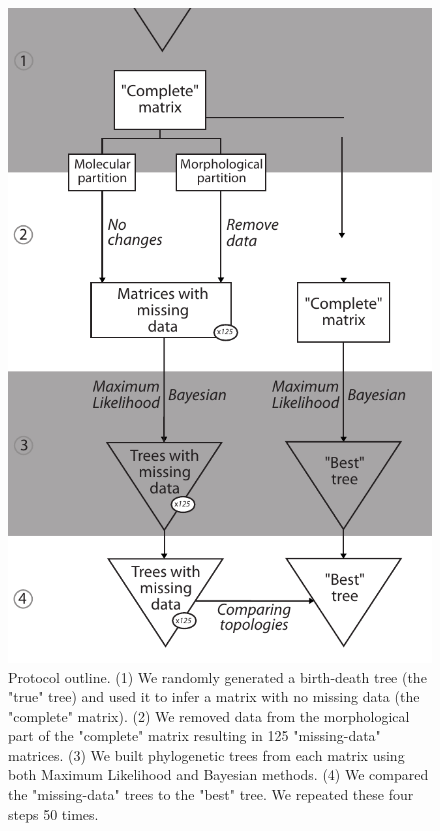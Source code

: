 \documentclass[12pt,letterpaper]{article}
\begin{document}
\begin{figure}
\centering
    \includegraphics[keepaspectratio=true]{Figures/In_main/Simulations_outline-BW.pdf}
\caption{Protocol outline.
(1) We randomly generated a birth-death tree (the "true" tree) and used it to infer a matrix with no missing data (the "complete" matrix).
(2) We removed data from the morphological part of the "complete" matrix resulting in 125 "missing-data" matrices.
(3) We built phylogenetic trees from each matrix using both Maximum Likelihood and Bayesian methods.
(4) We compared the "missing-data" trees to the "best" tree.
We repeated these four steps 50 times.}
\label{Fig_Outline}
\end{figure}
\end{document}
